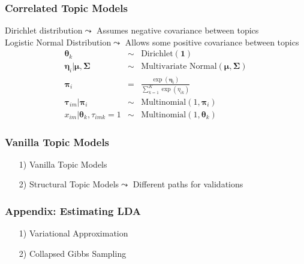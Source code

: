 \documentclass{beamer}
\numberwithin{equation}{section}
\begin{document}
\begin{frame}
\frametitle{Correlated Topic Models}

Dirichlet distribution$\leadsto$ Assumes negative covariance between topics\\
\alert{Logistic Normal Distribution}$\leadsto$ Allows some positive covariance between topics\\

\begin{eqnarray}
\boldsymbol{\theta}_{k} & \sim & \text{Dirichlet}(\boldsymbol{1}) \nonumber \\
\boldsymbol{\eta}_{i}| \boldsymbol{\mu}, \boldsymbol{\Sigma} & \sim & \text{Multivariate Normal}(\boldsymbol{\mu}, \boldsymbol{\Sigma}) \nonumber \\
\boldsymbol{\pi}_{i}  & = & \frac{\exp\left(\boldsymbol{\eta}_{i}\right)}{\sum_{k=1}^{K} \exp\left(\eta_{ik}\right)} \nonumber \\
\boldsymbol{\tau}_{im} | \boldsymbol{\pi}_{i} & \sim & \text{Multinomial}(1, \boldsymbol{\pi}_{i}) \nonumber \\
x_{im} | \boldsymbol{\theta}_{k}, \tau_{imk} = 1 & \sim & \text{Multinomial}(1, \boldsymbol{\theta}_{k}) \nonumber 
\end{eqnarray}



\end{frame}



\begin{frame}
\frametitle{Vanilla Topic Models}

\begin{itemize}
\item[1)] Vanilla Topic Models
\item[2)] Structural Topic Models$\leadsto$ Different paths for validations
\end{itemize}



\end{frame}


\begin{frame}
\frametitle{Appendix: Estimating LDA}

\begin{itemize}
\item[1)] Variational Approximation
\item[2)] Collapsed Gibbs Sampling
\end{itemize}

\end{frame}
\end{document}

